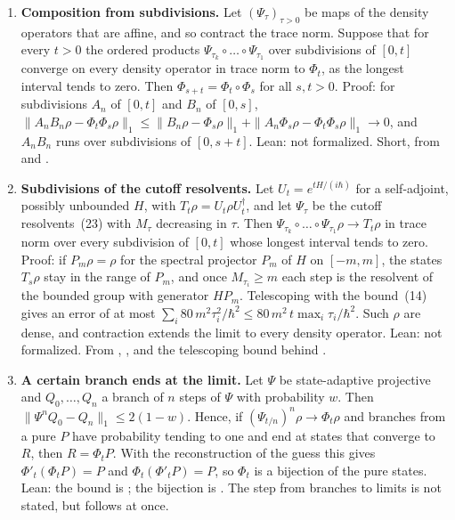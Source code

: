 \documentclass[11pt]{article}
\begin{document}
\begin{enumerate}
\renewcommand{\labelenumi}{P\arabic{enumi}.}
\item \textbf{Composition from subdivisions.} Let $(\Psi_\tau)_{\tau > 0}$ be maps of the density
  operators that are affine, and so contract the trace norm. Suppose that for every $t > 0$ the
  ordered products $\Psi_{\tau_k}\circ\dots\circ\Psi_{\tau_1}$ over subdivisions of $[0,t]$
  converge on every density operator in trace norm to $\Phi_t$, as the longest interval tends to
  zero. Then $\Phi_{s+t} = \Phi_t\circ\Phi_s$ for all $s, t > 0$.
  Proof: for subdivisions $A_n$ of $[0,t]$ and $B_n$ of $[0,s]$,
  $\|A_nB_n\rho - \Phi_t\Phi_s\rho\|_1 \le \|B_n\rho - \Phi_s\rho\|_1
  + \|A_n\Phi_s\rho - \Phi_t\Phi_s\rho\|_1 \to 0$, and $A_nB_n$ runs over subdivisions of
  $[0,s+t]$.\newline
  Lean: not formalized. Short, from  and
  .
\item \textbf{Subdivisions of the cutoff resolvents.} Let $U_t = e^{tH/(i\hbar)}$ for a
  self-adjoint, possibly unbounded $H$, with $T_t\rho = U_t\rho U_t^\dagger$, and let $\Psi_\tau$
  be the cutoff resolvents~(23) with $M_\tau$ decreasing in $\tau$. Then
  $\Psi_{\tau_k}\circ\dots\circ\Psi_{\tau_1}\rho \to T_t\rho$ in trace norm over every subdivision
  of $[0,t]$ whose longest interval tends to zero. Proof: if $P_m\rho = \rho$ for the spectral
  projector $P_m$ of $H$ on $[-m,m]$, the states $T_s\rho$ stay in the range of $P_m$, and once
  $M_{\tau_i} \ge m$ each step is the resolvent of the bounded group with generator $H P_m$.
  Telescoping with the bound~(14) gives an error of at most
  $\sum_i 80\,m^2\tau_i^2/\hbar^2 \le 80\,m^2\,t\max_i\tau_i/\hbar^2$. Such $\rho$ are dense, and
  contraction extends the limit to every density operator.\newline
  Lean: not formalized. From ,
  ,
   and the telescoping bound behind
  .
\item \textbf{A certain branch ends at the limit.} Let $\Psi$ be state-adaptive projective and
  $Q_0, \dots, Q_n$ a branch of $n$ steps of $\Psi$ with probability $w$. Then
  $\|\Psi^nQ_0 - Q_n\|_1 \le 2(1-w)$. Hence, if $(\Psi_{t/n})^n\rho \to \Phi_t\rho$ and branches
  from a pure $P$ have probability tending to one and end at states that converge to $R$, then
  $R = \Phi_tP$. With the reconstruction of the guess this gives $\Phi'_t(\Phi_tP) = P$ and
  $\Phi_t(\Phi'_tP) = P$, so $\Phi_t$ is a bijection of the pure states.\newline
  Lean: the bound is ; the bijection is
  . The step from branches to limits is not stated, but follows at once.
\end{enumerate}
\end{document}

